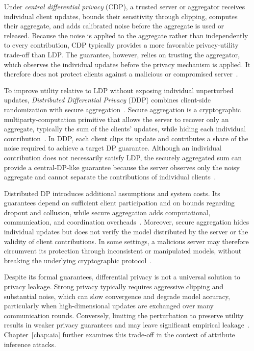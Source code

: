 Under \emph{central differential privacy} (CDP), a trusted server or aggregator receives individual client updates, bounds their sensitivity through clipping, computes their aggregate, and adds calibrated noise before the aggregate is used or released. Because the noise is applied to the aggregate rather than independently to every contribution, CDP typically provides a more favorable privacy-utility trade-off than LDP. The guarantee, however, relies on trusting the aggregator, which observes the individual updates before the privacy mechanism is applied. It therefore does not protect clients against a malicious or compromised server~\cite{mcmahan_user_dp,kairouz_open_problems}.

To improve utility relative to LDP without exposing individual unperturbed updates, \emph{Distributed Differential Privacy} (DDP) combines client-side randomization with secure aggregation~\cite{kairouz_discrete_gaussian, agarwal2021the, chen2022poisson}. Secure aggregation is a cryptographic multiparty-computation primitive that allows the server to recover only an aggregate, typically the sum of the clients' updates, while hiding each individual contribution~\cite{secure_aggregation_bonawitz,sok_secure_aggregation}. In DDP, each client clips its update and contributes a share of the noise required to achieve a target DP guarantee. Although an individual contribution does not necessarily satisfy LDP, the securely aggregated sum can provide a central-DP-like guarantee because the server observes only the noisy aggregate and cannot separate the contributions of individual clients~\cite{kairouz_discrete_gaussian, agarwal2021the, chen2022poisson}.

Distributed DP introduces additional assumptions and system costs. Its guarantees depend on sufficient client participation and on bounds regarding dropout and collusion, while secure aggregation adds computational, communication, and coordination overheads~\cite{kairouz_discrete_gaussian, chen2022fundamentalpricesecureaggregation}. Moreover, secure aggregation hides individual updates but does not verify the model distributed by the server or the validity of client contributions. In some settings, a malicious server may therefore circumvent its protection through inconsistent or manipulated models, without breaking the underlying cryptographic protocol~\cite{pasquiniEludingSecureAggregation2022a,zhaoLOKILargescaleData2023a}.

Despite its formal guarantees, differential privacy is not a universal solution to privacy leakage. Strong privacy typically requires aggressive clipping and substantial noise, which can slow convergence and degrade model accuracy, particularly when high-dimensional updates are exchanged over many communication rounds. Conversely, limiting the perturbation to preserve utility results in weaker privacy guarantees and may leave significant empirical leakage~\cite{Jayaraman_privacy_evaluation,cummings2024advancingdifferentialprivacyfuture}. Chapter~\ref{chap:aia} further examines this trade-off in the context of attribute inference attacks.

